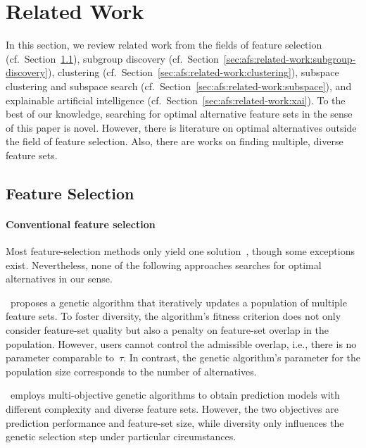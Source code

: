 \documentclass{article}
\theoremstyle{definition}
\begin{document}
\section{Related Work}
\label{sec:afs:related-work}

In this section, we review related work from the fields of feature selection (cf.~Section~\ref{sec:afs:related-work:feature-selection}), subgroup discovery (cf.~Section~\ref{sec:afs:related-work:subgroup-discovery}), clustering (cf.~Section~\ref{sec:afs:related-work:clustering}), subspace clustering and subspace search (cf.~Section~\ref{sec:afs:related-work:subspace}), and explainable artificial intelligence (cf.~Section~\ref{sec:afs:related-work:xai}).
To the best of our knowledge, searching for optimal alternative feature sets in the sense of this paper is novel.
However, there is literature on optimal alternatives outside the field of feature selection.
Also, there are works on finding multiple, diverse feature sets.

\subsection{Feature Selection}
\label{sec:afs:related-work:feature-selection}

\paragraph{Conventional feature selection}

Most feature-selection methods only yield one solution~\cite{borboudakis2021extending}, though some exceptions exist.
Nevertheless, none of the following approaches searches for optimal alternatives in our sense.

\cite{siddiqi2020genetic}~proposes a genetic algorithm that iteratively updates a population of multiple feature sets.
To foster diversity, the algorithm's fitness criterion does not only consider feature-set quality but also a penalty on feature-set overlap in the population.
However, users cannot control the admissible overlap, i.e., there is no parameter comparable to~$\tau$.
In contrast, the genetic algorithm's parameter for the population size corresponds to the number of alternatives.

\cite{emmanouilidis1999selecting}~employs multi-objective genetic algorithms to obtain prediction models with different complexity and diverse feature sets.
However, the two objectives are prediction performance and feature-set size, while diversity only influences the genetic selection step under particular circumstances.
\end{document}
